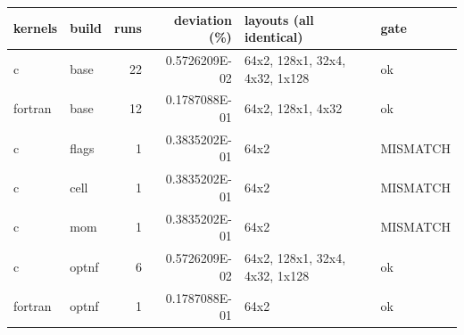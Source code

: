\begin{tabular}{llrrll}
\toprule
kernels & build & runs & deviation (\%) & layouts (all identical) & gate \\
\midrule
c & base & 22 & 0.5726209E-02 & 64x2, 128x1, 32x4, 4x32, 1x128 & ok \\
fortran & base & 12 & 0.1787088E-01 & 64x2, 128x1, 4x32 & ok \\
c & flags & 1 & 0.3835202E-01 & 64x2 & MISMATCH \\
c & cell & 1 & 0.3835202E-01 & 64x2 & MISMATCH \\
c & mom & 1 & 0.3835202E-01 & 64x2 & MISMATCH \\
c & optnf & 6 & 0.5726209E-02 & 64x2, 128x1, 32x4, 4x32, 1x128 & ok \\
fortran & optnf & 1 & 0.1787088E-01 & 64x2 & ok \\
\bottomrule
\end{tabular}

